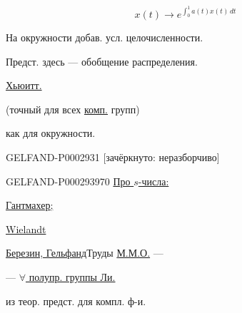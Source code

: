 \begin{equation*}x(t)\longrightarrow e^{\int_0^1 a(t)x(t)\,dt}\end{equation*}

На окружности добав. усл. целочисленности.

\begin{center}\end{center}

Предст. здесь --- обобщение распределения.



\hfill{}

\qquad\underline{Хьюитт.}

 (точный для всех \underline{комп.} групп)

как для окружности.





\begin{GelfandAdjacentEvidence}{GELFAND-P000293}{1}
[зачёркнуто: неразборчиво]

\end{GelfandAdjacentEvidence}


\begin{GelfandAdjacentEvidence}{GELFAND-P000293}{970}
\underline{Про $s$-числа:}

\begin{flushright}\begin{minipage}{.76\linewidth}
\underline{Гантмахер;}\par
\underline{Wielandt}\par
\underline{Березин, Гельфанд}\qquad Труды \underline{М.М.О.} ---\par
--- \underline{$\forall$ полупр. группы Ли.}\par
из теор. предст. для компл. ф-и.
\end{minipage}\end{flushright}\end{GelfandAdjacentEvidence}





